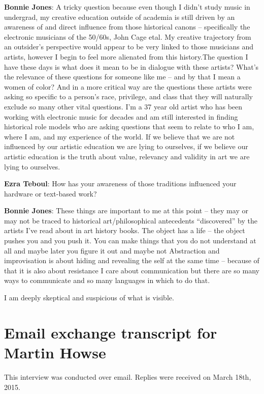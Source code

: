 \textbf{Bonnie Jones}: A tricky question because even though I didn’t study music in undergrad, my creative education outside of academia is still driven by an awareness of and direct influence from those historical canons – specifically the electronic musicians of the 50/60s, John Cage etal. My creative trajectory from an outsider’s perspective would appear to be very linked to those musicians and artists, however I begin to feel more alienated from this history.The question I have these days is what does it mean to be in dialogue with these artists? What’s the relevance of these questions for someone like me – and by that I mean a women of color? And in a more critical way are the questions these artists were asking so specific to a person’s race, privilege, and class that they will naturally exclude so many other vital questions. I’m a 37 year old artist who has been working with electronic music for decades and am still interested in finding historical role models who are asking questions that seem to relate to who I am, where I am, and my experience of the world. If we believe that we are not influenced by our artistic education we are lying to ourselves, if we believe our artistic education is the truth about value, relevancy and validity in art we are lying to ourselves. 

\textbf{Ezra Teboul}: How has your awareness of those traditions influenced your hardware or text-based work? 

\textbf{Bonnie Jones}: These things are important to me at this point – they may or may not be traced to historical art/philosophical antecedents ``discovered'' by the artists I’ve read about in art history books. The object has a life – the object pushes you and you push it. You can make things that you do not understand at all and maybe later you figure it out and maybe not Abstraction and improvisation is about hiding and revealing the self at the same time – because of that it is also about resistance 
I care about communication but there are so many ways to communicate and so many languages in which to do that.

I am deeply skeptical and suspicious of what is visible. 

\newpage

\clearpage 
\section{Email exchange transcript for Martin Howse}

This interview was conducted over email. Replies were received on March 18th, 2015. 

